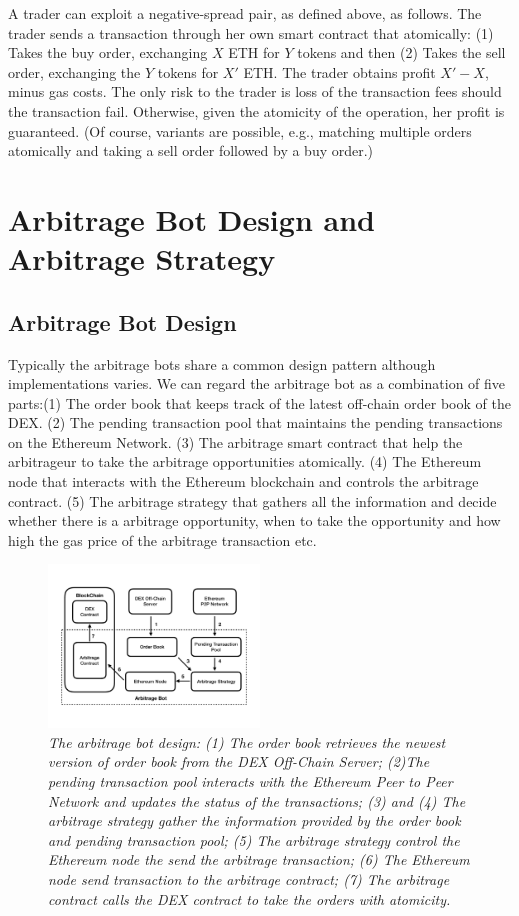 \documentclass[conference]{IEEEtran}
\begin{document}
A trader can exploit a negative-spread pair, as defined above, as follows. The trader sends a transaction through her own smart contract that atomically: (1) Takes the buy order, exchanging $X$ ETH for $Y$ tokens and then (2) Takes the sell order, exchanging the $Y$ tokens for $X'$ ETH. The trader obtains profit $X' - X$, minus gas costs. The only risk to the trader is loss of the transaction fees should the transaction fail. Otherwise, given the atomicity of the operation, her profit is guaranteed. (Of course, variants are possible, e.g., matching multiple orders atomically and taking a sell order followed by a buy order.) 

\section{Arbitrage Bot Design and Arbitrage Strategy}
\subsection{Arbitrage Bot Design}
Typically the arbitrage bots share a common design pattern although implementations varies. We can regard the arbitrage bot as a combination of five parts:(1) The order book that keeps track of the latest off-chain order book of the DEX. (2) The pending transaction pool that maintains the pending transactions on the Ethereum Network. (3) The arbitrage smart contract that help the arbitrageur to take the arbitrage opportunities atomically. (4) The Ethereum node that interacts with the Ethereum blockchain and controls the arbitrage contract. (5) The arbitrage strategy that gathers all the information and decide whether there is a arbitrage opportunity, when to take the opportunity and how high the gas price of the arbitrage transaction etc.


\begin{figure}
  \centering
    \includegraphics[width=0.5\textwidth]{figures/Arb_Bot_Design.pdf}
  \caption{\textit{The arbitrage bot design: (1) The order book retrieves the newest version of order book from the DEX Off-Chain Server; (2)The pending transaction pool interacts with the Ethereum Peer to Peer Network and updates the status of the transactions; (3) and (4) The arbitrage strategy gather the information provided by the order book and pending transaction pool; (5) The arbitrage strategy control the Ethereum node the send the arbitrage transaction; (6) The Ethereum node send transaction to the arbitrage contract; (7) The arbitrage contract calls the DEX contract to take the orders with atomicity.}}
\end{figure}
\end{document}
